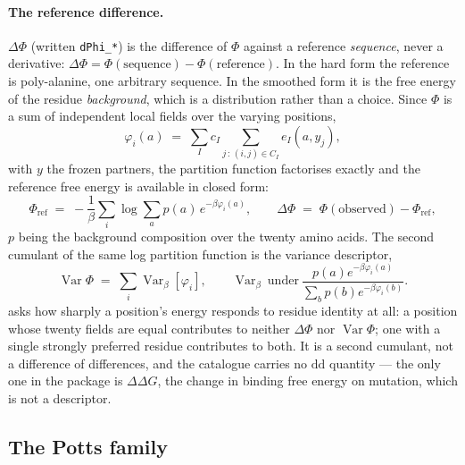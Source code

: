 \documentclass[11pt,a4paper]{article}
\newcommand{\dsc}[1]{\texttt{#1}}
\begin{document}
\paragraph{The reference difference.} $\Delta\Phi$ (written \dsc{dPhi\_*}) is the difference of
$\Phi$ against a reference \emph{sequence}, never a derivative:
$\Delta\Phi = \Phi(\text{sequence}) - \Phi(\text{reference})$. In the hard form the reference is
poly-alanine, one arbitrary sequence. In the smoothed form it is the free energy of the residue
\emph{background}, which is a distribution rather than a choice. Since $\Phi$ is a sum of
independent local fields over the varying positions,
%
\begin{equation}
\varphi_i(a) \;=\; \sum_{I} c_I \!\!\sum_{j \,:\, (i,j) \in C_I} \!\! e_I(a, y_j),
\label{eq:localfield}
\end{equation}
%
with $y$ the frozen partners, the partition function factorises exactly and the reference free
energy is available in closed form:
%
\begin{equation}
\Phi_{\mathrm{ref}} \;=\; -\frac{1}{\beta}\sum_i \log \sum_a p(a)\, e^{-\beta \varphi_i(a)},
\qquad
\Delta\Phi \;=\; \Phi(\text{observed}) - \Phi_{\mathrm{ref}},
\label{eq:softref}
\end{equation}
%
$p$ being the background composition over the twenty amino acids. The second cumulant of the same
log partition function is the variance descriptor,
%
\begin{equation}
\operatorname{Var}\Phi \;=\; \sum_i \operatorname{Var}_\beta[\varphi_i],
\qquad
\operatorname{Var}_\beta \ \text{under} \
\frac{p(a)e^{-\beta\varphi_i(a)}}{\sum_b p(b)e^{-\beta\varphi_i(b)}} .
\label{eq:varphi}
\end{equation}
%
 asks how sharply a position's energy responds to residue identity at all: a
position whose twenty fields are equal contributes to neither $\Delta\Phi$ nor $\operatorname{Var}
\Phi$; one with a single strongly preferred residue contributes to both. It is a second cumulant,
not a difference of differences, and the catalogue carries no $\mathrm{d}\mathrm{d}$ quantity --- the
only one in the package is $\Delta\Delta G$, the change in binding free energy on mutation, which is
not a descriptor.

\subsection{The Potts family}
\end{document}
